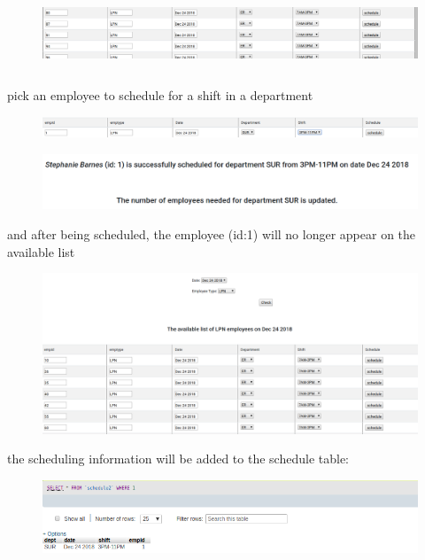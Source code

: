 \documentclass[11pt]{article}
\makeatletter
\def\maxwidth{\ifdim\Gin@nat@width>\linewidth\linewidth
    \else\Gin@nat@width\fi}
\let\Oldincludegraphics\includegraphics
\renewcommand{\includegraphics}[1]{\Oldincludegraphics[width=.8\maxwidth]{#1}}
\makeatother
\begin{document}
\begin{figure}[H]
\centering
\includegraphics{6.png}
\caption{}
\end{figure}

\[\]

pick an employee to schedule for a shift in a department

\begin{figure}[H]
\centering
\includegraphics{7.png}
\caption{}
\end{figure}

\begin{figure}[H]
\centering
\includegraphics{8.png}
\caption{}
\end{figure}

and after being scheduled, the employee (id:1) will no longer appear on
the available list

\begin{figure}[H]
\centering
\includegraphics{9.png}
\caption{}
\end{figure}

the scheduling information will be added to the schedule table:

\begin{figure}[H]
\centering
\includegraphics{15.png}
\caption{}
\end{figure}
\end{document}
